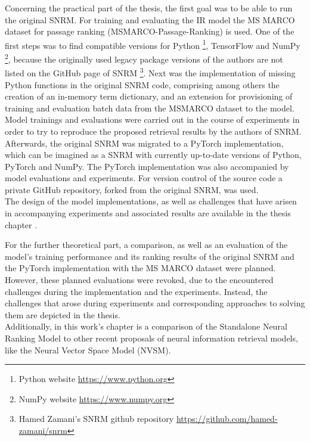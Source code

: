 Concerning the practical part of the thesis, the first goal was to be able 
    to run the original SNRM.
For training and evaluating the IR model the MS MARCO dataset
    for passage ranking (MSMARCO-Passage-Ranking) is used.
One of the first steps was to find compatible
    versions for Python 
    \footnote{Python website \url{https://www.python.org}}, 
    TensorFlow and NumPy
    \footnote{NumPy website \url{https://www.numpy.org}},
    because the originally used legacy package versions of the authors are not
    listed on the GitHub page of SNRM 
    \footnote{Hamed Zamani's SNRM github repository \url{https://github.com/hamed-zamani/snrm}}.
Next was the implementation of missing Python functions in the original SNRM code, 
    comprising among others the creation of an in-memory term dictionary, 
    and an extension for provisioning of training and evaluation batch data from the 
    MSMARCO dataset to the model.
Model trainings and evaluations were carried out in the course of experiments 
    in order to try to reproduce the proposed retrieval results by the authors of SNRM.\\
Afterwards, the original SNRM was migrated to a PyTorch implementation,
    which can be imagined as a SNRM with currently up-to-date versions of 
    Python, PyTorch and NumPy.
The PyTorch implementation was also accompanied by model evaluations and experiments.
For version control of the source code a private GitHub repository, forked from 
    the original SNRM, was used.\\
The design of the model implementations, as well as 
    challenges that have arisen in accompanying experiments and associated results 
    are available in the 
    thesis chapter .

For the further theoretical part, a comparison, as well as an evaluation of the model's
    training performance and its ranking results of the original SNRM and 
    the PyTorch implementation with the MS MARCO dataset 
    were planned. 
However, these planned evaluations were revoked,
    due to the encountered challenges during the implementation and the experiments.
Instead, the challenges that arose during experiments 
    and corresponding approaches to solving them are depicted in the thesis.\\
Additionally, in this work's chapter
    is a comparison of the Standalone Neural Ranking Model to other 
    recent proposals of neural information retrieval models,
    like the Neural Vector Space Model (NVSM).


